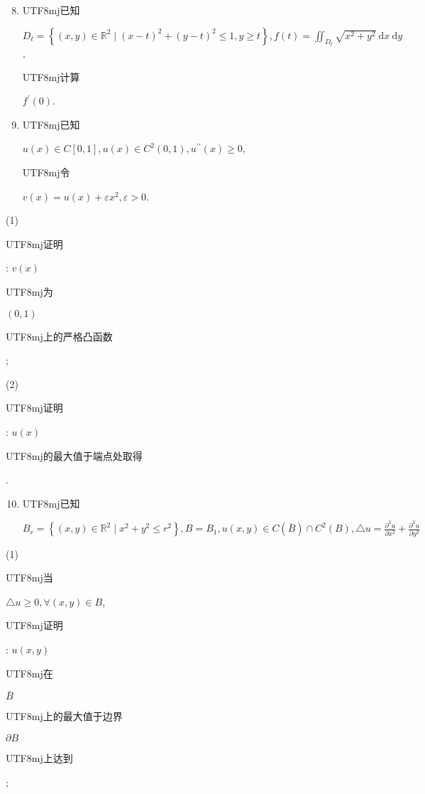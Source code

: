 \documentclass[10pt]{article}
\begin{document}
\begin{enumerate}
  \setcounter{enumi}{7}
  \item \begin{CJK}{UTF8}{mj}已知\end{CJK} $D_{t}=\left\{(x, y) \in \mathbb{R}^{2} \mid(x-t)^{2}+(y-t)^{2} \leqslant 1, y \geqslant t\right\}, f(t)=\iint_{D_{t}} \sqrt{x^{2}+y^{2}} \mathrm{~d} x \mathrm{~d} y$, \begin{CJK}{UTF8}{mj}计算\end{CJK} $f^{\prime}(0)$.

  \item \begin{CJK}{UTF8}{mj}已知\end{CJK} $u(x) \in C[0,1], u(x) \in C^{2}(0,1), u^{\prime \prime}(x) \geqslant 0$, \begin{CJK}{UTF8}{mj}令\end{CJK} $v(x)=u(x)+\varepsilon x^{2}, \varepsilon>0$.

\end{enumerate}
(1) \begin{CJK}{UTF8}{mj}证明\end{CJK}: $v(x)$ \begin{CJK}{UTF8}{mj}为\end{CJK} $(0,1)$ \begin{CJK}{UTF8}{mj}上的严格凸函数\end{CJK};

(2) \begin{CJK}{UTF8}{mj}证明\end{CJK}: $u(x)$ \begin{CJK}{UTF8}{mj}的最大值于端点处取得\end{CJK}.

\begin{enumerate}
  \setcounter{enumi}{9}
  \item \begin{CJK}{UTF8}{mj}已知\end{CJK} $B_{r}=\left\{(x, y) \in \mathbb{R}^{2} \mid x^{2}+y^{2} \leqslant r^{2}\right\}, B=B_{1}, u(x, y) \in C(\bar{B}) \cap C^{2}(B), \triangle u=\frac{\partial^{2} u}{\partial x^{2}}+\frac{\partial^{2} u}{\partial y^{2}}$
\end{enumerate}
(1) \begin{CJK}{UTF8}{mj}当\end{CJK} $\triangle u \geqslant 0, \forall(x, y) \in B$, \begin{CJK}{UTF8}{mj}证明\end{CJK}: $u(x, y)$ \begin{CJK}{UTF8}{mj}在\end{CJK} $\bar{B}$ \begin{CJK}{UTF8}{mj}上的最大值于边界\end{CJK} $\partial B$ \begin{CJK}{UTF8}{mj}上达到\end{CJK};
\end{document}
